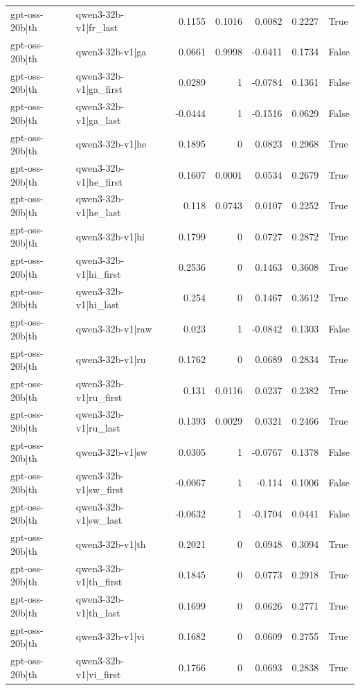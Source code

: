 \begin{table}
\begin{tabular}{l l r r r r l}
gpt-oss-20b|th & qwen3-32b-v1|fr_last & 0.1155 & 0.1016 & 0.0082 & 0.2227 & True \\
gpt-oss-20b|th & qwen3-32b-v1|ga & 0.0661 & 0.9998 & -0.0411 & 0.1734 & False \\
gpt-oss-20b|th & qwen3-32b-v1|ga_first & 0.0289 & 1 & -0.0784 & 0.1361 & False \\
gpt-oss-20b|th & qwen3-32b-v1|ga_last & -0.0444 & 1 & -0.1516 & 0.0629 & False \\
gpt-oss-20b|th & qwen3-32b-v1|he & 0.1895 & 0 & 0.0823 & 0.2968 & True \\
gpt-oss-20b|th & qwen3-32b-v1|he_first & 0.1607 & 0.0001 & 0.0534 & 0.2679 & True \\
gpt-oss-20b|th & qwen3-32b-v1|he_last & 0.118 & 0.0743 & 0.0107 & 0.2252 & True \\
gpt-oss-20b|th & qwen3-32b-v1|hi & 0.1799 & 0 & 0.0727 & 0.2872 & True \\
gpt-oss-20b|th & qwen3-32b-v1|hi_first & 0.2536 & 0 & 0.1463 & 0.3608 & True \\
gpt-oss-20b|th & qwen3-32b-v1|hi_last & 0.254 & 0 & 0.1467 & 0.3612 & True \\
gpt-oss-20b|th & qwen3-32b-v1|raw & 0.023 & 1 & -0.0842 & 0.1303 & False \\
gpt-oss-20b|th & qwen3-32b-v1|ru & 0.1762 & 0 & 0.0689 & 0.2834 & True \\
gpt-oss-20b|th & qwen3-32b-v1|ru_first & 0.131 & 0.0116 & 0.0237 & 0.2382 & True \\
gpt-oss-20b|th & qwen3-32b-v1|ru_last & 0.1393 & 0.0029 & 0.0321 & 0.2466 & True \\
gpt-oss-20b|th & qwen3-32b-v1|sw & 0.0305 & 1 & -0.0767 & 0.1378 & False \\
gpt-oss-20b|th & qwen3-32b-v1|sw_first & -0.0067 & 1 & -0.114 & 0.1006 & False \\
gpt-oss-20b|th & qwen3-32b-v1|sw_last & -0.0632 & 1 & -0.1704 & 0.0441 & False \\
gpt-oss-20b|th & qwen3-32b-v1|th & 0.2021 & 0 & 0.0948 & 0.3094 & True \\
gpt-oss-20b|th & qwen3-32b-v1|th_first & 0.1845 & 0 & 0.0773 & 0.2918 & True \\
gpt-oss-20b|th & qwen3-32b-v1|th_last & 0.1699 & 0 & 0.0626 & 0.2771 & True \\
gpt-oss-20b|th & qwen3-32b-v1|vi & 0.1682 & 0 & 0.0609 & 0.2755 & True \\
gpt-oss-20b|th & qwen3-32b-v1|vi_first & 0.1766 & 0 & 0.0693 & 0.2838 & True \\

\end{tabular}
\end{table}
